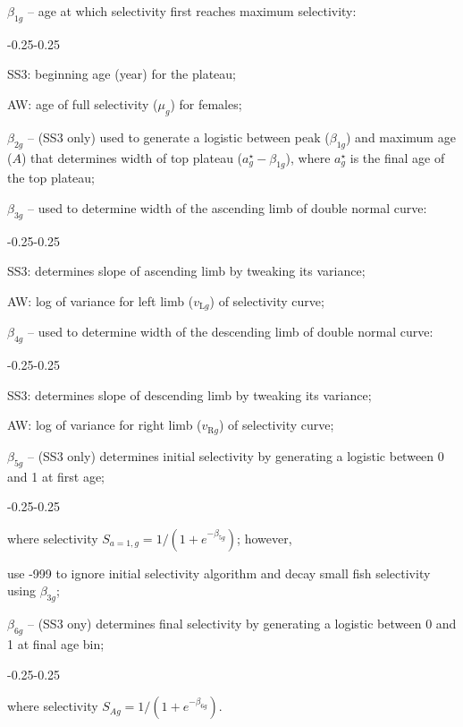 \documentclass[11pt]{book}
\newcommand{\mr}[1]{\text{#1}}
\begin{document}
\begin{enumerate_itemize}{}{}
  \item $\beta_{1g}$ -- age at which selectivity first reaches maximum selectivity:
    \begin{enumerate_itemize}{-0.25}{-0.25}
      \item SS3: beginning age (year) for the plateau;
      \item AW: age of full selectivity ($\mu_g$) for females;
    \end{enumerate_itemize}
  \item $\beta_{2g}$ -- (SS3 only) used to generate a logistic between peak ($\beta_{1g}$) and maximum age ($A$) that determines width of top plateau ($a_g^{\star} - \beta_{1g}$), where $a_g^{\star}$ is the final age of the top plateau;
  \item $\beta_{3g}$ -- used to determine width of the ascending limb of double normal curve:
    \begin{enumerate_itemize}{-0.25}{-0.25}
      \item SS3: determines slope of ascending limb by tweaking its variance;
      \item AW: log of variance for left limb ($v_{\mr{L}g}$) of selectivity curve;
    \end{enumerate_itemize}
  \item $\beta_{4g}$ -- used to determine width of the descending limb of double normal curve:
    \begin{enumerate_itemize}{-0.25}{-0.25}
      \item SS3: determines slope of descending limb by tweaking its variance;
      \item AW: log of variance for right limb ($v_{\mr{R}g}$) of selectivity curve;
    \end{enumerate_itemize}
  \item $\beta_{5g}$ -- (SS3 only) determines initial selectivity by generating a logistic between 0 and 1 at first age;
    \begin{enumerate_itemize}{-0.25}{-0.25}
      \item where selectivity $S_{a{=}1,g} = 1/(1+e^{-\beta_{5g}})$; however,
      \item use -999 to ignore initial selectivity algorithm and decay small fish selectivity using $\beta_{3g}$;
    \end{enumerate_itemize}
  \item $\beta_{6g}$ -- (SS3 ony) determines final selectivity by generating a logistic between 0 and 1 at final age bin;
    \begin{enumerate_itemize}{-0.25}{-0.25}
      \item where selectivity $S_{Ag} = 1/(1+e^{-\beta_{6g}})$.
    \end{enumerate_itemize}
\end{enumerate_itemize}
\end{document}
